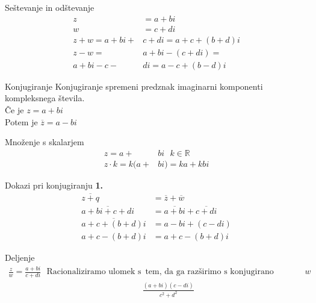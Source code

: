 \documentclass{article}
\begin{document}
\begin{minipage}[t]{0.45\textwidth}
\vspace{0pt}
\begin{defbox}[equal height group=racunanje]{Seštevanje in odštevanje}
\begin{align*}
z&=a+bi\\
w&=c+di\\
z+w=a+bi+&c+di=\boxed{a+c+(b+d)i}\\[8pt]
z-w=&a+bi-(c+di)=\\
a+bi-c-&di=\boxed{a-c+(b-d)i}
\end{align*}
\end{defbox}
\begin{defbox}[equal height group=konjugiranje]{Konjugiranje}
Konjugiranje spremeni predznak imaginarni komponenti kompleksnega števila.\\ 
Če je $z=a+bi$\\
Potem je $\overline{z}=a-bi$
\end{defbox}
\end{minipage}
\hfill
\begin{minipage}[t]{0.45\textwidth}
\vspace{0pt}
\begin{defbox}[equal height group=racunanje]{Množenje s skalarjem}
\begin{align*}
z=a+&bi \ \ \ k \in \mathbb{R}\\
z \cdot k = k(a+&bi)=ka+kbi
\end{align*}
\end{defbox}
\begin{zgledbox}[equal height group=konjugiranje]{Dokazi pri konjugiranju}
\textbf{1.}
\begin{align*}
\overline{z+q}&=\overline{z}+\overline{w}\\
\overline{a+bi+c+di}&=\overline{a+bi}+\overline{c+di}\\
\overline{a+c+(b+d)i}&=a-bi+(c-di)\\
a+c-(b+d)i&=a+c-(b+d)i
\end{align*}
\end{zgledbox}
\end{minipage}
\begin{defbox}{Deljenje}
\begin{align*}
\frac{z}{w}=\frac{a+bi}{c+di}\hspace{8pt} \text{Racionaliziramo ulomek s}&\text{ tem, da ga razširimo s konjugirano vrednostjo }w\\
&\boxed{\frac{(a+bi)(c-di)}{c^2+d^2}}
\end{align*}
\end{defbox}
\end{document}
